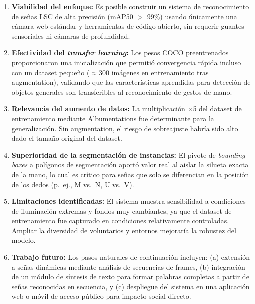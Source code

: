 \documentclass[12pt,letterpaper]{article}
\begin{document}
\begin{enumerate}[leftmargin=*, label=\arabic*.]
    \item \textbf{Viabilidad del enfoque:} Es posible construir un sistema de reconocimiento de señas LSC de alta precisión (mAP50 $>$ 99\%) usando únicamente una cámara web estándar y herramientas de código abierto, sin requerir guantes sensoriales ni cámaras de profundidad.

    \item \textbf{Efectividad del \textit{transfer learning}:} Los pesos COCO preentrenados proporcionaron una inicialización que permitió convergencia rápida incluso con un dataset pequeño ($\approx$300 imágenes en entrenamiento tras augmentation), validando que las características aprendidas para detección de objetos generales son transferibles al reconocimiento de gestos de mano.

    \item \textbf{Relevancia del aumento de datos:} La multiplicación $\times$5 del dataset de entrenamiento mediante Albumentations fue determinante para la generalización. Sin augmentation, el riesgo de sobreajuste habría sido alto dado el tamaño original del dataset.

    \item \textbf{Superioridad de la segmentación de instancias:} El pivote de \textit{bounding boxes} a polígonos de segmentación aportó valor real al aislar la silueta exacta de la mano, lo cual es crítico para señas que solo se diferencian en la posición de los dedos (p.~ej., M vs.~N, U vs.~V).

    \item \textbf{Limitaciones identificadas:} El sistema muestra sensibilidad a condiciones de iluminación extremas y fondos muy cambiantes, ya que el dataset de entrenamiento fue capturado en condiciones relativamente controladas. Ampliar la diversidad de voluntarios y entornos mejoraría la robustez del modelo.

    \item \textbf{Trabajo futuro:} Los pasos naturales de continuación incluyen: (a) extensión a señas dinámicas mediante análisis de secuencias de frames, (b) integración de un módulo de síntesis de texto para formar palabras completas a partir de señas reconocidas en secuencia, y (c) despliegue del sistema en una aplicación web o móvil de acceso público para impacto social directo.
\end{enumerate}

\end{document}
